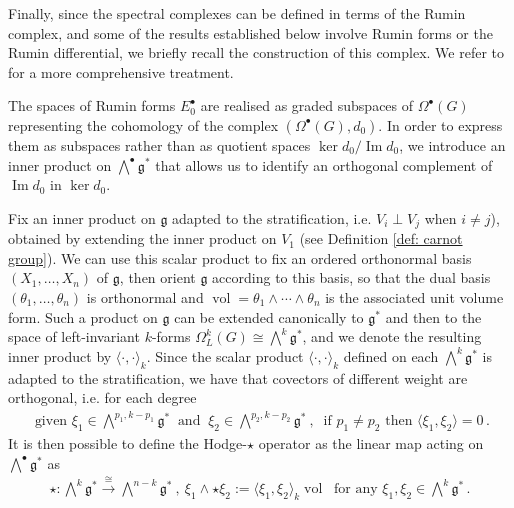\documentclass[dvipsnames]{amsart}
\theoremstyle{definition}
\theoremstyle{definition}
\numberwithin{equation}{section}
\begin{document}
Finally, since the spectral complexes can be defined in terms of the Rumin complex, and some of the results established below involve Rumin forms or the Rumin differential, we briefly recall the construction of this complex. We refer to \cite{rumin_grenoble,rumin_palermo,CompensatedCompactness,FT} for a more comprehensive treatment.

The spaces of Rumin forms $E_0^\bullet$ are realised as graded subspaces of $\Omega^\bullet(G)$ representing the cohomology of the complex $(\Omega^\bullet(G),d_0)$. In order to express them as subspaces rather than as quotient spaces $\ker d_0/\operatorname{Im}d_0$, we introduce an inner product on $\bigwedge^\bullet\mathfrak g^*$ that allows us to identify an orthogonal complement of $\operatorname{Im}d_0$ in $\ker d_0$.

Fix an inner product on $\mathfrak g$ adapted to the stratification, i.e. $V_i\perp V_j$ when $i\neq j$), obtained by extending the inner product on $V_1$ (see Definition \ref{def: carnot group}). We can use this scalar product to fix an ordered orthonormal basis $(X_1,\ldots,X_n)$ of $\mathfrak{g}$, then orient $\mathfrak{g}$ according to this  basis, so that the dual basis $(\theta_1,\ldots,\theta_n)$ is orthonormal and $\operatorname{vol}=\theta_1\wedge\cdots\wedge\theta_n$ is the associated unit volume form. Such a product on $\mathfrak{g}$ can be extended canonically to $\mathfrak{g}^\ast$ and then to the space of left-invariant $k$-forms $\Omega_L^k(G)\cong\bigwedge^k\mathfrak g^\ast$, and we denote the resulting inner product by $\langle\cdot,\cdot\rangle_k$. Since the scalar product $\langle\cdot,\cdot\rangle_k$ defined on each $\bigwedge^k\mathfrak{g}^\ast$ is adapted to the stratification, we have that covectors of different weight are orthogonal, i.e. for each degree 
\begin{align*}
    \text{ given }\xi_1\in\bigwedge\nolimits^{p_1,k-p_1}\mathfrak{g}^\ast\ \text{ and }\ \xi_2\in\bigwedge\nolimits^{p_2,k-p_2}\mathfrak{g}^\ast\ ,\ \text{ if }p_1\neq p_2\text{ then }\langle\xi_1,\xi_2\rangle=0\,.
\end{align*}
It is then possible to define the Hodge-$\star$ operator as the linear map acting on $\bigwedge^\bullet\mathfrak{g}^\ast$ as
\begin{align*}
    \star\colon\bigwedge\nolimits^k\mathfrak{g}^\ast\xrightarrow[]{\cong}\bigwedge\nolimits^{n-k}\mathfrak{g}^\ast\ ,\ \xi_1\wedge\star\xi_2:=\langle\xi_1,\xi_2\rangle_k\operatorname{vol}\ \text{ for any }\xi_1,\xi_2\in\bigwedge\nolimits^k\mathfrak{g}^\ast\,.
\end{align*}
\end{document}
